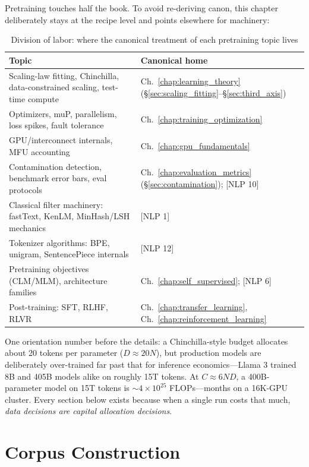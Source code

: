 Pretraining touches half the book. To avoid re-deriving canon, this chapter deliberately stays at the recipe level and points elsewhere for machinery:

\begin{table}[H]
\centering
\small
\caption{Division of labor: where the canonical treatment of each pretraining topic lives}
\label{tab:pretrain_ownership}
\begin{tabularx}{\textwidth}{Xl}
\toprule
\textbf{Topic} & \textbf{Canonical home} \\
\midrule
Scaling-law fitting, Chinchilla, data-constrained scaling, test-time compute & Ch.~\ref{chap:learning_theory} (\S\ref{sec:scaling_fitting}--\S\ref{sec:third_axis}) \\
Optimizers, muP, parallelism, loss spikes, fault tolerance & Ch.~\ref{chap:training_optimization} \\
GPU/interconnect internals, MFU accounting & Ch.~\ref{chap:gpu_fundamentals} \\
Contamination detection, benchmark error bars, eval protocols & Ch.~\ref{chap:evaluation_metrics} (\S\ref{sec:contamination}); [NLP 10] \\
Classical filter machinery: fastText, KenLM, MinHash/LSH mechanics & [NLP 1] \\
Tokenizer algorithms: BPE, unigram, SentencePiece internals & [NLP 12] \\
Pretraining objectives (CLM/MLM), architecture families & Ch.~\ref{chap:self_supervised}; [NLP 6] \\
Post-training: SFT, RLHF, RLVR & Ch.~\ref{chap:transfer_learning}, Ch.~\ref{chap:reinforcement_learning} \\
\bottomrule
\end{tabularx}
\end{table}

One orientation number before the details: a Chinchilla-style budget allocates about 20 tokens per parameter ($D \approx 20N$), but production models are deliberately over-trained far past that for inference economics---Llama 3 trained 8B and 405B models alike on roughly 15T tokens. At $C \approx 6ND$, a 400B-parameter model on 15T tokens is $\sim 4 \times 10^{25}$ FLOPs---months on a 16K-GPU cluster. Every section below exists because when a single run costs that much, \textit{data decisions are capital allocation decisions}.

\section{Corpus Construction}
\label{sec:pretrain_corpus}

